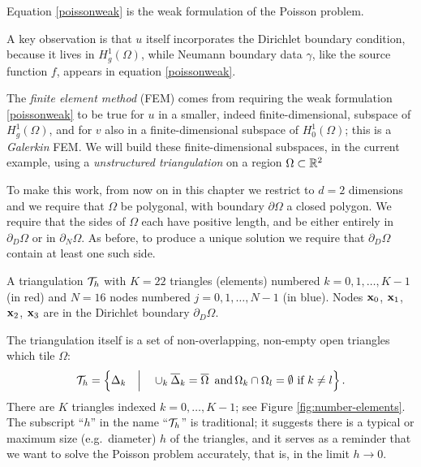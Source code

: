 Equation \eqref{poissonweak} is the weak formulation of the Poisson problem.
\begin{comment}
\marginnote{%
\begin{tikzpicture}[scale=0.4]
\draw[line width=2pt] (0,0) -- (0,2) -- node[sloped,below] {$\partial_D\Omega$} (5,2) -- (8,0);
\draw[line width=0.75pt] (8,0) -- (6,-3) -- node[sloped,above] {$\partial_N\Omega$} (-1,-6) -- (-1,-5);
\draw[line width=0.75pt] (-1,-5) -- (-1,-4) -- (2,-3);
\draw[line width=0.75pt] (2,-3) -- (0,-2) -- (0,0);
\draw (4,-1) node {$\Omega$};
\end{tikzpicture}}
\end{comment}
A key observation is that $u$ itself incorporates the Dirichlet boundary condition, because it lives in $H_g^1(\Omega)$, while Neumann boundary data $\gamma$, like the source function $f$, appears in equation \eqref{poissonweak}.

The \emph{finite element method} (FEM) comes from requiring the weak formulation  \eqref{poissonweak} to be true for $u$ in a smaller, indeed finite-dimensional, subspace of $H_g^1(\Omega)$, and for $v$ also in a finite-dimensional subspace of $H_0^1(\Omega)$; this is a \emph{Galerkin} FEM.  We will build these finite-dimensional subspaces, in the current example, using a \emph{unstructured triangulation} on a region $\Omega\subset \mathbb{R}^2$

To make this work, from now on in this chapter we restrict to $d=2$ dimensions and we require that $\Omega$ be polygonal, with boundary $\partial\Omega$ a closed polygon.  We require that the sides of $\Omega$ each have positive length, and be either entirely in $\partial_D\Omega$ or in $\partial_N\Omega$.  As before, to produce a unique solution we require that $\partial_D\Omega$ contain at least one such side.

\begin{marginfigure}

\caption{A triangulation $\mathcal{T}_h$ with $K=22$ triangles (elements) numbered $k=0,1,\dots,K-1$ (in {\color{red} red}) and $N=16$ nodes numbered $j=0,1,\dots,N-1$  (in {\color{blue} blue}).  Nodes $\mathbf{x}_0$, $\mathbf{x}_1$, $\mathbf{x}_2$, $\mathbf{x}_3$ are in the Dirichlet boundary $\partial_D\Omega$.}
\label{fig:number-elements}
\end{marginfigure}

The triangulation itself is a set of non-overlapping, non-empty open triangles which tile $\Omega$:
\begin{equation*}
\mathcal{T}_h = \left\{\Delta_k \quad\Big|\quad \cup_k \overline{\Delta}_k = \overline{\Omega} \, \text{ and} \, \Omega_k \cap \Omega_l = \emptyset \text{ if } k\ne l\right\}.
\end{equation*}
There are $K$ triangles indexed $k=0,\dots,K-1$; see Figure \ref{fig:number-elements}.  The subscript ``$h$'' in the name ``$\mathcal{T}_h$'' is traditional; it suggests there is a typical or maximum size (e.g.~diameter) $h$ of the triangles, and it serves as a reminder that we want to solve the Poisson problem accurately, that is, in the limit $h\to 0$.

